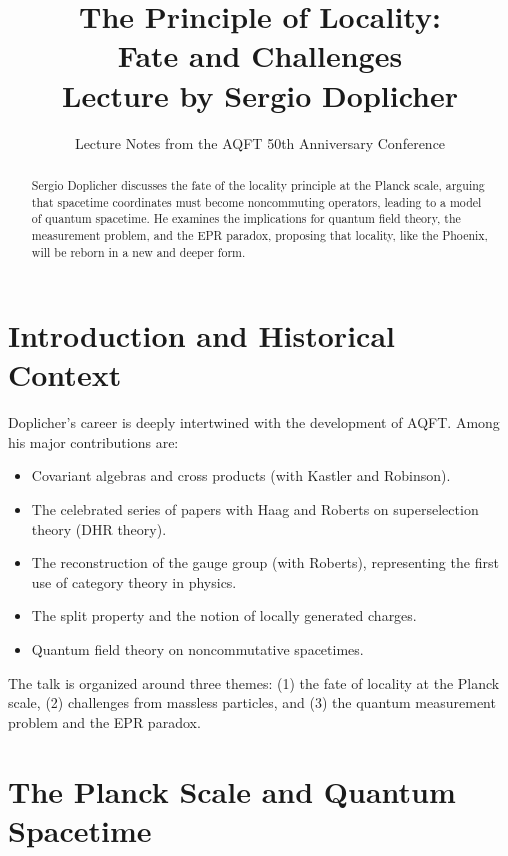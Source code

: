 \documentclass[11pt,a4paper]{article}
\title{\textbf{The Principle of Locality:\\Fate and Challenges}\\[6pt]
\large Lecture by Sergio Doplicher}
\author{Lecture Notes from the AQFT 50th Anniversary Conference}
\date{}
\begin{document}
\maketitle

\begin{abstract}
Sergio Doplicher discusses the fate of the locality principle at the Planck scale,
arguing that spacetime coordinates must become noncommuting operators, leading to
a model of quantum spacetime. He examines the implications for quantum field theory,
the measurement problem, and the EPR paradox, proposing that locality, like the
Phoenix, will be reborn in a new and deeper form.
\end{abstract}

\tableofcontents

\section{Introduction and Historical Context}

Doplicher's career is deeply intertwined with the development of AQFT.
Among his major contributions are:
\begin{itemize}[nosep]
  \item Covariant algebras and cross products (with Kastler and Robinson).
  \item The celebrated series of papers with Haag and Roberts on superselection
        theory (DHR theory).
  \item The reconstruction of the gauge group (with Roberts), representing
        the first use of category theory in physics.
  \item The split property and the notion of locally generated charges.
  \item Quantum field theory on noncommutative spacetimes.
\end{itemize}

The talk is organized around three themes: (1) the fate of locality at
the Planck scale, (2) challenges from massless particles, and
(3) the quantum measurement problem and the EPR paradox.

\section{The Planck Scale and Quantum Spacetime}
\end{document}
